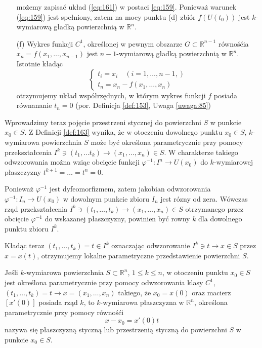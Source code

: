 \documentclass[leqno]{article}
\begin{document}
\begin{justify}
\begin{ex}
\begin{itemize}
            możemy zapisać układ (\ref{eq:161}) w postaci \ref{eq:159}. Ponieważ warunek (\ref{eq:159}) jest spełniony, zatem na mocy punktu (d) zbiór $f(U(t_0))$
            jest $k$-wymiarową gładką powierzchnią w $\mathbb{R}^n$.
        \item [(f)]
            Wykres funkcji $C^1$, określonej w pewnym obszarze $G \subset \mathbb{R}^{n-1}$ równośćia 
            $x_n = f(x_1, \ldots, x_{n-1})$ jest $n-1$-wymiarową gładką powierzchnią w $\mathbb{R}^n$. Istotnie kładąc 
            \[
                \begin{cases}
                    t_i = x_i \quad (i = 1, \ldots, n-1,) \\
                    t_n = x_n - f(x_1, \ldots, x_n)
                \end{cases}
            \]
            otrzymujemy układ współrzędnych, w którym wykres funkcji $f$ posiada równananie $t_n = 0$ (por. Definicja \ref{def:153}, Uwaga \ref{uwaga:85})
    \end{itemize}
\end{ex}

Wprowadzimy teraz pojęcie przestrzeni stycznej do powierzchni $S$ w punkcie $x_0 \in S$. Z Definicji \ref{def:163} wynika, że w otoczeniu dowolnego punktu 
$x_0 \in S$, $k$-wymiarowa powierzchnia $S$ może być określona parametrycznie przy pomocy przekształcenia $I^k \ni (t_1, \ldots t_k) \to (x_1, \ldots, x_n) \in S$.
W charakterze takiego odwzorowania można wziąc obcięcie funkcji $\varphi^{-1} : I^n \to U(x_0)$ do $k$-wymiarowej płaszczyzny $t^{k+1} = \ldots = t^n = 0$.

Ponieważ $\varphi^{-1}$ jest dyfeomorfizmem, zatem jakobian odwzorowania $\varphi^{-1} : I_n \to U(x_0)$ w dowolnym punkcie zbioru $I_n$ jest rózny od zera.
Wówczas rząd przekształcenia $I^k \ni (t_1, \ldots, t_k) \to (x_1, \ldots, x_n) \in S$ otrzymanego przez obcięcie $\varphi^{-1}$ do wskazanej 
płaszczyzny, powinien być rowny $k$ dla dowolnego punktu zbioru $I^k$. 

Kładąc teraz $(t_1, \ldots, t_k) = t \in I^k$ oznaczając odwzorowanie $I^k \ni t \to x \in S$ przez $x = x(t)$, otrzymujemy lokalne parametryczne przedstawienie powierzchni $S$.

\begin{defn}
    Jeśli $k$-wymiarowa powierzchnia $S \subset \mathbb{R}^n$, $1 \leqslant k \leqslant n$, w otoczeniu punktu $x_0 \in S$ jest określona parametrycznie przy
    pomocy odwzorowania klasy $C^1$, $(t_1, \ldots, t_k) = t \to x = (x_1, \ldots, x_n)$ takiego, że $x_0 = x(0)$ oraz macierz $[x'(0)]$ posiada rząd $k$, to 
    $k$-wymiarowa płaszczyzna w $\mathbb{R}^n$, określona parametrycznie przy pomocy równośći 
    \begin{equation}\label{eq:162}
        x - x_0 = x'(0)t
    \end{equation}
    nazywa się płaszczyzną styczną lub przestrzenią styczną do powierzchni $S$ w punkcie $x_0 \in S$.
\end{defn}


\end{justify}
\end{document}
